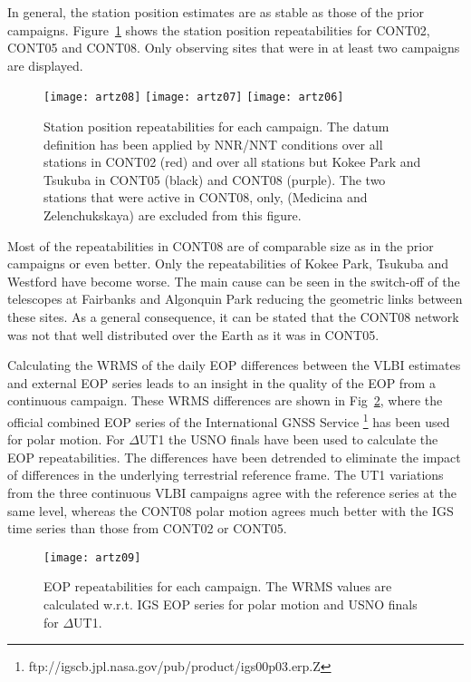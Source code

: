 \documentclass[natbib,twocolumn,twoside]{svmultiag}
\begin{document}
In general, the station position estimates are as stable as those of the prior
campaigns.
Figure~\ref{fig:sta_rep} shows the station position repeatabilities for
CONT02, CONT05 and CONT08.
Only observing sites that were in at least two campaigns are displayed.
\begin{figure}[t]
 \centering
 \texttt{[image: artz08]}
 \texttt{[image: artz07]}
 \texttt{[image: artz06]}
 \caption{Station position repeatabilities for each campaign. 
          The datum definition has been applied by NNR/NNT conditions
          over all stations in CONT02 (red) and over all stations
          but Kokee Park and Tsukuba in CONT05 (black) and CONT08 
          (purple). The two stations that were active in CONT08, only,
          (Medicina and Zelenchukskaya) are excluded from this figure.}
 \label{fig:sta_rep}
\end{figure}
Most of the repeatabilities in CONT08 are of comparable size as in the prior
campaigns or even better.
Only the repeatabilities of Kokee Park, Tsukuba and Westford have become
worse.
The main cause can be seen in the switch-off of the telescopes at Fairbanks 
and Algonquin Park reducing the geometric links between these sites.
As a general consequence, it can be stated that the CONT08 network was not
that well distributed over the Earth as it was in CONT05.

Calculating the WRMS of the daily EOP differences between the VLBI estimates
and external EOP series leads to an insight in the quality of the EOP from a 
continuous campaign.
These WRMS differences are shown in Fig~\ref{fig:erp_rep}, where the official
combined EOP series of the International GNSS Service
\footnote{ftp://igscb.jpl.nasa.gov/pub/product/igs00p03.erp.Z} has been used
for polar motion.
For $\Delta$UT1 the USNO finals have been used to calculate the EOP
repeatabilities.
The differences have been detrended to eliminate the impact of differences
in the underlying terrestrial reference frame.
The UT1 variations from the three continuous VLBI campaigns agree with the 
reference series at the same level, whereas the CONT08 polar motion agrees
much better with the IGS time series than those from CONT02 or CONT05.
\begin{figure}[t]
 \centering
 \texttt{[image: artz09]}
 \caption{EOP repeatabilities for each campaign. 
          The WRMS values are calculated w.r.t. IGS EOP series
          for polar motion and USNO finals for $\Delta$UT1.}
 \label{fig:erp_rep}
\end{figure}
\end{document}
